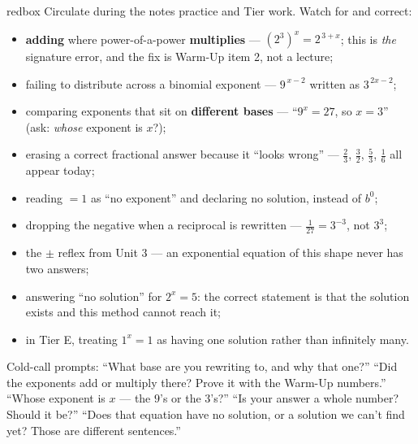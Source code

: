 \documentclass[10pt]{article}
\begin{document}
\begin{skillbox}{redbox}
Circulate during the notes practice and Tier work. Watch for and correct:
\begin{itemize}[leftmargin=1.2em, nosep]
  \item \textbf{adding} where power-of-a-power \textbf{multiplies} --- $\left(2^{3}\right)^{x}=2^{\,3+x}$; this is \emph{the} signature error, and the fix is Warm-Up item 2, not a lecture;
  \item failing to distribute across a binomial exponent --- $9^{\,x-2}$ written as $3^{\,2x-2}$;
  \item comparing exponents that sit on \textbf{different bases} --- ``$9^{x}=27$, so $x=3$'' (ask: \emph{whose} exponent is $x$?);
  \item erasing a correct fractional answer because it ``looks wrong'' --- $\frac23$, $\frac32$, $\frac53$, $\frac16$ all appear today;
  \item reading $=1$ as ``no exponent'' and declaring no solution, instead of $b^{0}$;
  \item dropping the negative when a reciprocal is rewritten --- $\frac{1}{27}=3^{-3}$, not $3^{3}$;
  \item the $\pm$ reflex from Unit 3 --- an exponential equation of this shape never has two answers;
  \item answering ``no solution'' for $2^{x}=5$: the correct statement is that the solution exists and this method cannot reach it;
  \item in Tier E, treating $1^{x}=1$ as having one solution rather than infinitely many.
\end{itemize}
Cold-call prompts: ``What base are you rewriting to, and why that one?'' ``Did the exponents add or
multiply there? Prove it with the Warm-Up numbers.'' ``Whose exponent is $x$ --- the $9$'s or the
$3$'s?'' ``Is your answer a whole number? Should it be?'' ``Does that equation have no solution, or a
solution we can't find yet? Those are different sentences.''
\end{skillbox}
\end{document}
